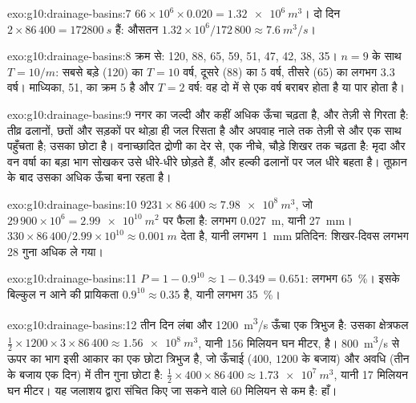 \begin{solution}{exo:g10:drainage-basins:7}
$66 \times 10^6 \times 0.020 = \qty{1.32e6}{m^3}$। दो दिन
$2 \times 86\,400 = \qty{172800}{s}$ हैं: औसतन $1.32 \times 10^6/172\,800 \approx
\qty{7.6}{m^3/s}$।
\end{solution}

\begin{solution}{exo:g10:drainage-basins:8}
क्रम से: 120, 88, 65, 59, 51, 47, 42, 38, 35। $n = 9$ के साथ $T = 10/m$:
सबसे बड़े (120) का $T = 10$ वर्ष, दूसरे (88) का 5 वर्ष, तीसरे (65) का
लगभग 3.3 वर्ष। माध्यिका, 51, का क्रम 5 है और $T = 2$ वर्ष: वह दो में से एक वर्ष
बराबर होता है या पार होता है।
\end{solution}

\begin{solution}{exo:g10:drainage-basins:9}
नगर का  जल्दी और कहीं अधिक ऊँचा चढ़ता है, और तेज़ी से गिरता है:
तीव्र ढलानों, छतों और सड़कों पर थोड़ा ही जल रिसता है और अपवाह नाले तक
तेज़ी से और एक साथ पहुँचता है; उसका  छोटा है। वनाच्छादित द्रोणी का
 देर से, एक नीचे, चौड़े शिखर तक चढ़ता है: मृदा और वन
वर्षा का बड़ा भाग सोखकर उसे धीरे-धीरे छोड़ते हैं, और हल्की ढलानों पर जल
धीरे बहता है। तूफ़ान के बाद उसका  अधिक ऊँचा बना रहता है।
\end{solution}

\begin{solution}{exo:g10:drainage-basins:10}
$9231 \times 86\,400 \approx \qty{7.98e8}{m^3}$, जो
$29\,900 \times 10^6 = \qty{2.99e10}{m^2}$ पर फैला है: लगभग \qty{0.027}{m},
यानी \qty{27}{mm}।  $330 \times 86\,400/2.99 \times 10^{10}
\approx \qty{0.001}{m}$ देता है, यानी लगभग \qty{1}{mm} प्रतिदिन: शिखर-दिवस लगभग
28 गुना अधिक ले गया।
\end{solution}

\begin{solution}{exo:g10:drainage-basins:11}
$P = 1 - 0.9^{10} \approx 1 - 0.349 = 0.651$: लगभग \qty{65}{\percent}। इसके
बिल्कुल न आने की प्रायिकता $0.9^{10} \approx 0.35$ है, यानी लगभग
\qty{35}{\percent}।
\end{solution}

\begin{solution}{exo:g10:drainage-basins:12}
 तीन दिन लंबा और \qty{1200}{m^3/s} ऊँचा एक त्रिभुज है: उसका
क्षेत्रफल $\tfrac12 \times 1200 \times 3 \times 86\,400 \approx
\qty{1.56e8}{m^3}$, यानी \num{156} मिलियन घन मीटर, है।
\qty{800}{m^3/s} से ऊपर का भाग इसी आकार का एक छोटा त्रिभुज है, जो ऊँचाई ($400$, $1200$ के बजाय) और अवधि (तीन के बजाय एक दिन) में तीन गुना
छोटा है: $\tfrac12 \times 400 \times 86\,400 \approx \qty{1.73e7}{m^3}$,
यानी \num{17} मिलियन घन मीटर। यह जलाशय द्वारा संचित किए जा सकने वाले \num{60} मिलियन से
कम है: हाँ।
\end{solution}

